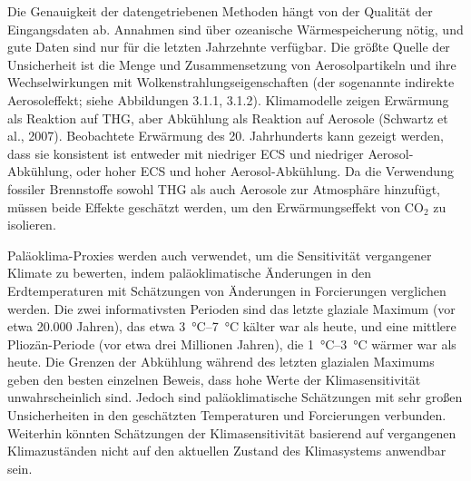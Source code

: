 \documentclass[12pt,paper=a4,DIV=12,parskip=never,chapterprefix=false,headings=standardclasses]{scrreprt}
\begin{document}
Die Genauigkeit der datengetriebenen Methoden hängt von der Qualität der Eingangsdaten ab. Annahmen sind über ozeanische Wärmespeicherung nötig, und gute Daten sind nur für die letzten Jahrzehnte verfügbar. Die größte Quelle der Unsicherheit ist die Menge und Zusammensetzung von Aerosolpartikeln und ihre Wechselwirkungen mit Wolkenstrahlungseigenschaften (der sogenannte indirekte Aerosoleffekt; siehe Abbildungen 3.1.1, 3.1.2). Klimamodelle zeigen Erwärmung als Reaktion auf THG, aber Abkühlung als Reaktion auf Aerosole (Schwartz et al., 2007). Beobachtete Erwärmung des 20. Jahrhunderts kann gezeigt werden, dass sie konsistent ist entweder mit niedriger ECS und niedriger Aerosol-Abkühlung, oder hoher ECS und hoher Aerosol-Abkühlung. Da die Verwendung fossiler Brennstoffe sowohl THG als auch Aerosole zur Atmosphäre hinzufügt, müssen beide Effekte geschätzt werden, um den Erwärmungseffekt von CO$_2$ zu isolieren.

Paläoklima-Proxies werden auch verwendet, um die Sensitivität vergangener Klimate zu bewerten, indem paläoklimatische Änderungen in den Erdtemperaturen mit Schätzungen von Änderungen in Forcierungen verglichen werden. Die zwei informativsten Perioden sind das letzte glaziale Maximum (vor etwa 20.000 Jahren), das etwa \SIrange{3}{7}{\celsius} kälter war als heute, und eine mittlere Pliozän-Periode (vor etwa drei Millionen Jahren), die \SIrange{1}{3}{\celsius} wärmer war als heute. Die Grenzen der Abkühlung während des letzten glazialen Maximums geben den besten einzelnen Beweis, dass hohe Werte der Klimasensitivität unwahrscheinlich sind. Jedoch sind paläoklimatische Schätzungen mit sehr großen Unsicherheiten in den geschätzten Temperaturen und Forcierungen verbunden. Weiterhin könnten Schätzungen der Klimasensitivität basierend auf vergangenen Klimazuständen nicht auf den aktuellen Zustand des Klimasystems anwendbar sein.
\end{document}
